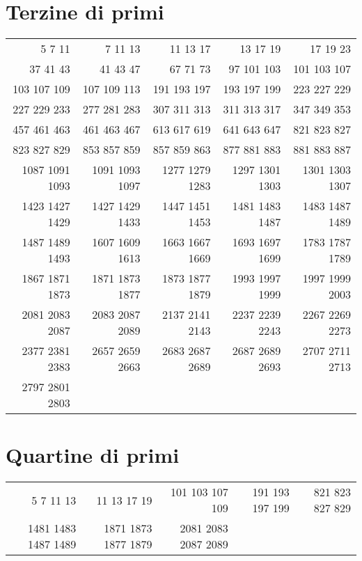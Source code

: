 \section{Terzine di primi}
\begin{center}
 \footnotesize
 \begin{tabular}{*{5}{r}}
  \toprule 
 5 7 11 & 7 11 13 & 11 13 17 & 13 17 19 & 17 19 23 \\
 37 41 43 & 41 43 47 & 67 71 73 & 97 101 103 & 101 103 107 \\
 103 107 109 & 107 109 113 & 191 193 197 & 193 197 199 & 223 227 229 \\
 227 229 233 & 277 281 283 & 307 311 313 & 311 313 317 & 347 349 353 \\
 457 461 463 & 461 463 467 & 613 617 619 & 641 643 647 & 821 823 827 \\
 823 827 829 & 853 857 859 & 857 859 863 & 877 881 883 & 881 883 887 \\
 1087 1091 1093 & 1091 1093 1097 & 1277 1279 1283 & 1297 1301 1303 & 1301 1303 1307 \\
 1423 1427 1429 & 1427 1429 1433 & 1447 1451 1453 & 1481 1483 1487 & 1483 1487 1489 \\
 1487 1489 1493 & 1607 1609 1613 & 1663 1667 1669 & 1693 1697 1699 & 1783 1787 1789 \\
 1867 1871 1873 & 1871 1873 1877 & 1873 1877 1879 & 1993 1997 1999 & 1997 1999 2003 \\
 2081 2083 2087 & 2083 2087 2089 & 2137 2141 2143 & 2237 2239 2243 & 2267 2269 2273 \\
 2377 2381 2383 & 2657 2659 2663 & 2683 2687 2689 & 2687 2689 2693 & 2707 2711 2713 \\
 2797 2801 2803 \\ 
  \bottomrule
 \end{tabular}
\end{center}
\section{Quartine di primi}
\begin{center}
 \footnotesize
 \begin{tabular}{*{5}{r}}
  \toprule 
 5 7 11 13 & 11 13 17 19 & 101 103 107 109 & 191 193 197 199 & 821 823 827 829 \\
 1481 1483 1487 1489 & 1871 1873 1877 1879 & 2081 2083 2087 2089 \\
  \bottomrule
 \end{tabular}
\end{center}